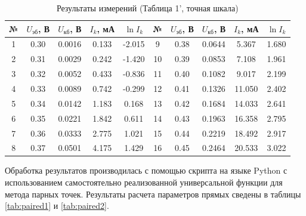 \begin{table}[ht!]
\centering
\caption{Результаты измерений (Таблица 1', точная шкала)}
\label{tab:raw2}
\small
\begin{tabular}{|c|c|c|c|c||c|c|c|c|c|}
\hline
№ & $U_{эб}$, В & $U_{кб}$, В & $I_k$, мА & $\ln I_k$ & № & $U_{эб}$, В & $U_{кб}$, В & $I_k$, мА & $\ln I_k$ \\ \hline
1 & 0.30 & 0.0016 & 0.133 & -2.015 & 9  & 0.38 & 0.0644 & 5.367 & 1.680 \\ \hline
2 & 0.31 & 0.0029 & 0.242 & -1.420 & 10 & 0.39 & 0.0853 & 7.108 & 1.961 \\ \hline
3 & 0.32 & 0.0052 & 0.433 & -0.836 & 11 & 0.40 & 0.1082 & 9.017 & 2.199 \\ \hline
4 & 0.33 & 0.0089 & 0.742 & -0.299 & 12 & 0.41 & 0.1326 & 11.050 & 2.402 \\ \hline
5 & 0.34 & 0.0142 & 1.183 & 0.168  & 13 & 0.42 & 0.1684 & 14.033 & 2.641 \\ \hline
6 & 0.35 & 0.0221 & 1.842 & 0.611  & 14 & 0.43 & 0.1963 & 16.358 & 2.795 \\ \hline
7 & 0.36 & 0.0333 & 2.775 & 1.021  & 15 & 0.44 & 0.2219 & 18.492 & 2.917 \\ \hline
8 & 0.37 & 0.0501 & 4.175 & 1.429  & 16 & 0.45 & 0.2464 & 20.533 & 3.022 \\ \hline
\end{tabular}
\end{table}

Обработка результатов производилась с помощью скрипта на языке Python с использованием самостоятельно реализованной универсальной функции для метода парных точек. Результаты расчета параметров прямых сведены в таблицы \ref{tab:paired1} и \ref{tab:paired2}.

